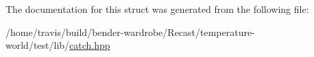 The documentation for this struct was generated from the following file\-:\begin{DoxyCompactItemize}
\item 
/home/travis/build/bender-\/wardrobe/\-Recast/temperature-\/world/test/lib/\hyperlink{catch_8hpp}{catch.\-hpp}\end{DoxyCompactItemize}
